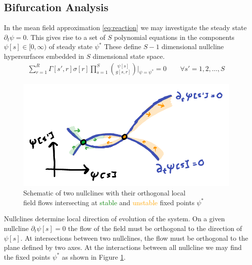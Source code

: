 \subsection{Bifurcation Analysis}
In the mean field approximation \eqref{eq:reaction} we may investigate the
steady state $\partial_t\psi=0$. This gives rise to a set of $S$ polynomial
equations in the components $\psi[s]\in[0,\infty)$ of steady state $\psi^*$
These define $S-1$ dimensional nullcline hypersurfaces embedded in $S$
dimensional state space.
\begin{align}
	\sum_{r=1}^R\Gamma[s',r]\sigma[r]
		\prod_{s=1}^S{\psi[s] \choose g[s,r]}
		\bigg|_{\psi=\psi^*}
		=0\qquad\forall s'=1,2,\dots,S
	\label{eq:steadystate}
\end{align}

\begin{figure}[H]
\centering{}
\captionsetup{justification=centering}
\includegraphics[scale=0.35]{figures/nullclines}
\caption{Schematic of two nullclines with their orthogonal local\\ field flows intersecting
at \textcolor{Green}{stable} and \textcolor{orange}{unstable} fixed points $\psi^*$}
\label{fig:nullclines}
\end{figure}
Nullclines determine local direction of evolution of the system. On a given
nullcline $\partial_t\psi[s]=0$ the flow of the field must be orthogonal to
the direction of $\psi[s]$. At intersections between two nullclines, the flow
must be orthogonal to the plane defined by two axes. At the interactions between
all nullcline we may find the fixed points $\psi^*$ as shown in Figure \ref{fig:nullclines}.

